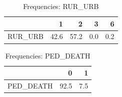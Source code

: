 \begin{table}[ht]
\centering
\begin{tabular}{rrrrr}
  \toprule
 & 1 & 2 & 3 & 6 \\ 
  \midrule
RUR\_URB & 42.6 & 57.2 & 0.0 & 0.2 \\ 
   \bottomrule
\end{tabular}
\caption{Frequencies: RUR_URB} 
\end{table}
\begin{table}[ht]
\centering
\begin{tabular}{rrr}
  \toprule
 & 0 & 1 \\ 
  \midrule
PED\_DEATH & 92.5 & 7.5 \\ 
   \bottomrule
\end{tabular}
\caption{Frequencies: PED_DEATH} 
\end{table}
